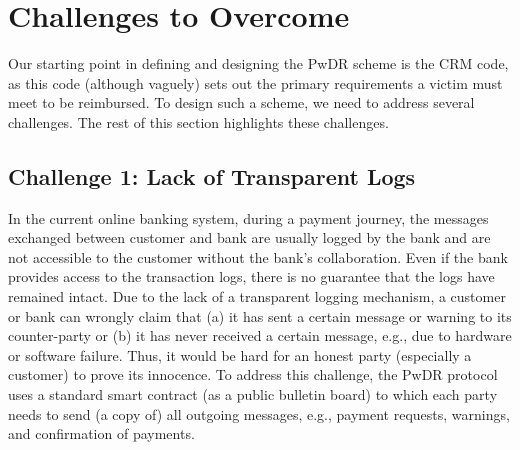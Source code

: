 

\section{Challenges to Overcome}\label{sec:: challenges}


Our starting point in defining and  designing the PwDR scheme is the CRM code, as this code (although vaguely) sets out the primary requirements a victim must meet to be reimbursed.  To design such a scheme, we need to address  several challenges. The rest of this section  highlights these challenges. 





\subsection{Challenge 1: Lack of Transparent Logs} 
In the current online  banking system, during a payment journey, the messages exchanged between customer and bank are usually logged by the bank and are not accessible to the customer without the bank's collaboration. Even if the bank provides access to the transaction logs, there is no guarantee that the logs have remained intact. Due to the lack of a transparent logging mechanism, a customer or bank can wrongly claim that (a) it has sent a certain message or warning to its counter-party or (b) it has never  received a certain message, e.g., due to hardware or software failure.  Thus, it would be hard for an honest party (especially a customer) to prove its innocence. To address this challenge, the PwDR protocol uses a standard smart contract (as a public bulletin board) to which  each party needs to send (a copy of) all outgoing messages, e.g., payment requests, warnings, and  confirmation of payments. 




